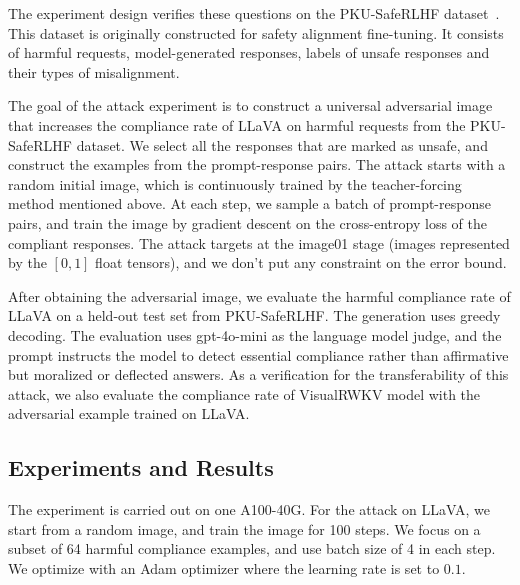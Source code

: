 \documentclass{article}
\begin{document}
The experiment design verifies these questions on the PKU-SafeRLHF dataset~\cite{Ji2024PKUSafeRLHF}. This dataset is originally constructed for safety alignment fine-tuning. It consists of harmful requests, model-generated responses, labels of unsafe responses and their types of misalignment.

The goal of the attack experiment is to construct a universal adversarial image that increases the compliance rate of LLaVA on harmful requests from the PKU-SafeRLHF dataset.
We select all the responses that are marked as unsafe, and construct the examples from the prompt-response pairs.
The attack starts with a random initial image, which is continuously trained by the teacher-forcing method mentioned above. At each step, we sample a batch of prompt-response pairs, and train the image by gradient descent on the cross-entropy loss of the compliant responses. The attack targets at the image01 stage (images represented by the $[0, 1]$ float tensors), and we don't put any constraint on the error bound.

After obtaining the adversarial image, we evaluate the harmful compliance rate of LLaVA on a held-out test set from PKU-SafeRLHF. 
The generation uses greedy decoding. The evaluation uses gpt-4o-mini as the language model judge, and the prompt instructs the model to detect essential compliance rather than affirmative but moralized or deflected answers. As a verification for the transferability of this attack, we also evaluate the compliance rate of VisualRWKV model with the adversarial example trained on LLaVA.

\subsection{Experiments and Results}

The experiment is carried out on one A100-40G.
For the attack on LLaVA, we start from a random image, and train the image for 100 steps. We focus on a subset of 64 harmful compliance examples, and use batch size of 4 in each step. We optimize with an Adam optimizer where the learning rate is set to $0.1$.
\end{document}
